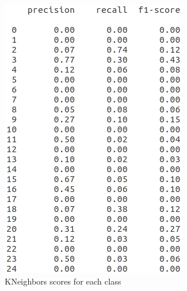 \documentclass{article} %
\begin{document}
\begin{figure}[H]
	\includegraphics[width=\linewidth]{kn_score.png}
	\caption{KNeighbors scores for each class}\label{fig:kn_score.png}
	\endminipage
\end{figure}
\end{document}

